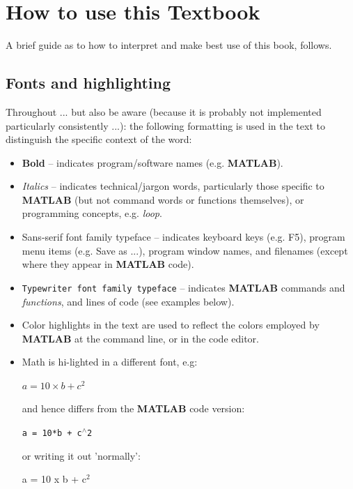 \documentclass{tufte-book} %
\begin{document}
\cleardoublepage

\chapter{How to use this Textbook} %

A brief guide as to how to interpret and make best use of this book, follows.


\section{Fonts and highlighting}

Throughout ... but also be aware (because it is probably not implemented particularly consistently ...): the following formatting is used in the text to distinguish the specific context of the word:

\begin{itemize}[noitemsep]
\setlength{\itemindent}{.2in}

\item \textbf{Bold} -- indicates program/software names (e.g. \textbf{MATLAB}).

\item \textit{Italics} -- indicates technical/jargon words, particularly those specific to \textbf{MATLAB} (but not command words or functions themselves), or programming concepts, e.g. \textit{loop}.

\item \textsf{Sans-serif font family typeface} -- indicates keyboard keys (e.g. \textsf{F5}), program menu items (e.g. \textsf{Save as ...}), program window names, and filenames (except where they appear in \textbf{MATLAB} code).

\item \texttt{Typewriter font family typeface} -- indicates \textbf{MATLAB} commands and \textit{functions}, and lines of code (see examples below).

\item Color highlights in the text are used to reflect the colors employed by \textbf{MATLAB} at the command line, or in the code editor.

\item Math is hi-lighted in a  different font, e.g:

\(a = 10\times b + c^{2}\)

and hence differs from the \textbf{MATLAB} code version:

\texttt{a = 10*b + c\(^{\wedge}\)2}

or writing it out 'normally':

a = 10 x b + c\(^{2}\)

\end{itemize}
\end{document}
